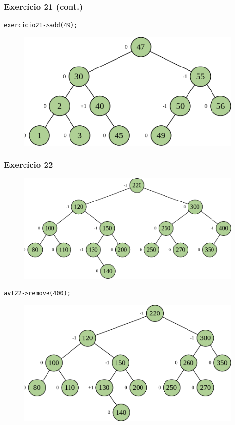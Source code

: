 \documentclass[aspectratio=169]{beamer}
\begin{document}
\begin{frame}[fragile]\frametitle{Exercício 21 (cont.)}
\texttt{exercicio21->add(49);}
\begin{figure}[h]
	\centering
	\includegraphics[height=0.35\paperheight]{imagens/avl-exercicio21k.png}
\end{figure}
\end{frame}

\begin{frame}[fragile]\frametitle{Exercício 22}
\begin{figure}[h]
	\centering
	\includegraphics[height=0.32\paperheight]{imagens/avl-exercicio22a.png}
\end{figure}
\texttt{avl22->remove(400);}
\begin{figure}[h]
	\centering
	\includegraphics[height=0.32\paperheight]{imagens/avl-exercicio22b.png}
\end{figure}
\end{frame}
\end{document}
